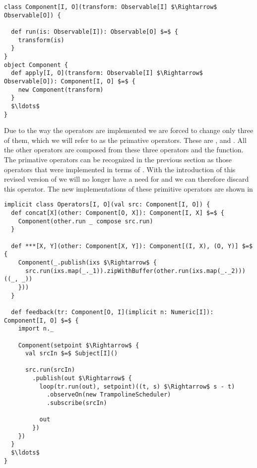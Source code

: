 \begin{lstlisting}[style=ScalaStyle, caption={Revised version of the \comp interface}, label={lst:component-v2}]
class Component[I, O](transform: Observable[I] $\Rightarrow$ Observable[O]) {

  def run(is: Observable[I]): Observable[O] $=$ {
    transform(is)
  }
}
object Component {
  def apply[I, O](transform: Observable[I] $\Rightarrow$ Observable[O]): Component[I, O] $=$ {
    new Component(transform)
  }
  $\ldots$
}
\end{lstlisting}

Due to the way the operators are implemented we are forced to change only three of them, which we will refer to as the primative operators. These are , \code{(***)} and . All the other operators are composed from these three operators and the  function. The primative operators can be recognized in the previous section as those operators that were implemented in terms of . With the introduction of this revised version of \comp we will no longer have a need for  and we can therefore discard this operator.  The new implementations of these primitive operators are shown in 

\begin{lstlisting}[style=ScalaStyle, caption={Revised implementations of the primitive operators}, label={lst:primative-operator-revisions}]
implicit class Operators[I, O](val src: Component[I, O]) {
  def concat[X](other: Component[O, X]): Component[I, X] $=$ {
    Component(other.run _ compose src.run)
  }
  
  def ***[X, Y](other: Component[X, Y]): Component[(I, X), (O, Y)] $=$ {
    Component(_.publish(ixs $\Rightarrow$ {
      src.run(ixs.map(_._1)).zipWithBuffer(other.run(ixs.map(_._2)))((_, _))
    }))
  }
  
  def feedback(tr: Component[O, I](implicit n: Numeric[I]): Component[I, O] $=$ {
    import n._
    
    Component(setpoint $\Rightarrow$ {
      val srcIn $=$ Subject[I]()
      
      src.run(srcIn)
        .publish(out $\Rightarrow$ {
          loop(tr.run(out), setpoint)((t, s) $\Rightarrow$ s - t)
            .observeOn(new TrampolineScheduler)
            .subscribe(srcIn)

          out
        })
    })
  }
  $\ldots$
}
\end{lstlisting}

